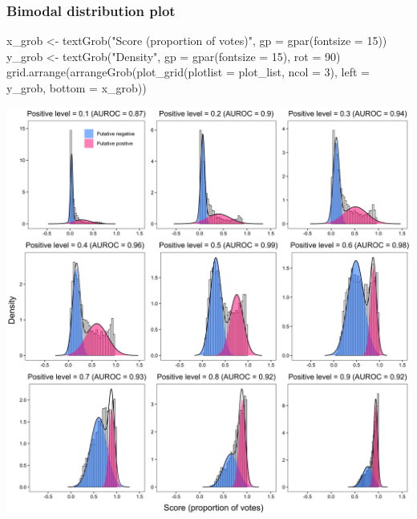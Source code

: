 \documentclass[
  11pt,
  oneside]{book}
\newenvironment{Shaded}{\begin{snugshade}}{\end{snugshade}}
\newcommand{\AttributeTok}[1]{\textcolor[rgb]{0.77,0.63,0.00}{#1}}
\newcommand{\DecValTok}[1]{\textcolor[rgb]{0.00,0.00,0.81}{#1}}
\newcommand{\FunctionTok}[1]{\textcolor[rgb]{0.00,0.00,0.00}{#1}}
\newcommand{\NormalTok}[1]{#1}
\newcommand{\OtherTok}[1]{\textcolor[rgb]{0.56,0.35,0.01}{#1}}
\newcommand{\StringTok}[1]{\textcolor[rgb]{0.31,0.60,0.02}{#1}}
\begin{document}
\hypertarget{bimodal-distribution-plot}{%
\subsubsection{Bimodal distribution plot}\label{bimodal-distribution-plot}}

\begin{Shaded}
\begin{Highlighting}[]
\NormalTok{x\_grob }\OtherTok{\textless{}{-}} \FunctionTok{textGrob}\NormalTok{(}\StringTok{"Score (proportion of votes)"}\NormalTok{, }\AttributeTok{gp =} \FunctionTok{gpar}\NormalTok{(}\AttributeTok{fontsize =} \DecValTok{15}\NormalTok{))}
\NormalTok{y\_grob }\OtherTok{\textless{}{-}} \FunctionTok{textGrob}\NormalTok{(}\StringTok{"Density"}\NormalTok{, }\AttributeTok{gp =} \FunctionTok{gpar}\NormalTok{(}\AttributeTok{fontsize =} \DecValTok{15}\NormalTok{), }\AttributeTok{rot =} \DecValTok{90}\NormalTok{)}
\FunctionTok{grid.arrange}\NormalTok{(}\FunctionTok{arrangeGrob}\NormalTok{(}\FunctionTok{plot\_grid}\NormalTok{(}\AttributeTok{plotlist =}\NormalTok{ plot\_list, }\AttributeTok{ncol =} \DecValTok{3}\NormalTok{), }\AttributeTok{left =}\NormalTok{ y\_grob, }\AttributeTok{bottom =}\NormalTok{ x\_grob))}
\end{Highlighting}
\end{Shaded}

\begin{center}\includegraphics[width=1\linewidth]{./figures/Supplementary Fig 1} \end{center}
\end{document}
